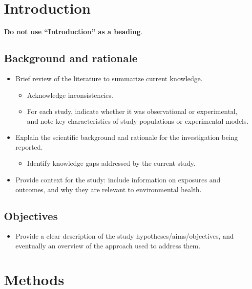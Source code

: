 \documentclass[
  letterpaper,
  DIV=11,
  numbers=noendperiod]{scrartcl}
\providecommand{\tightlist}{%
  \setlength{\itemsep}{0pt}\setlength{\parskip}{0pt}}\usepackage{longtable,booktabs,array}
\begin{document}
\section{Introduction}\label{sec-intro}

\textbf{Do not use ``Introduction'' as a heading}.

\subsection{Background and rationale}\label{sec-background}

\begin{itemize}
\tightlist
\item
  Brief review of the literature to summarize current knowledge.

  \begin{itemize}
  \tightlist
  \item
    Acknowledge inconsistencies.
  \item
    For each study, indicate whether it was observational or
    experimental, and note key characteristics of study populations or
    experimental models.
  \end{itemize}
\item
  Explain the scientific background and rationale for the investigation
  being reported.

  \begin{itemize}
  \tightlist
  \item
    Identify knowledge gaps addressed by the current study.
  \end{itemize}
\item
  Provide context for the study: include information on exposures and
  outcomes, and why they are relevant to environmental health.
\end{itemize}

\subsection{Objectives}\label{sec-objectives}

\begin{itemize}
\tightlist
\item
  Provide a clear description of the study hypotheses/aims/objectives,
  and eventually an overview of the approach used to address them.
\end{itemize}

\section{Methods}\label{sec-methods}
\end{document}
